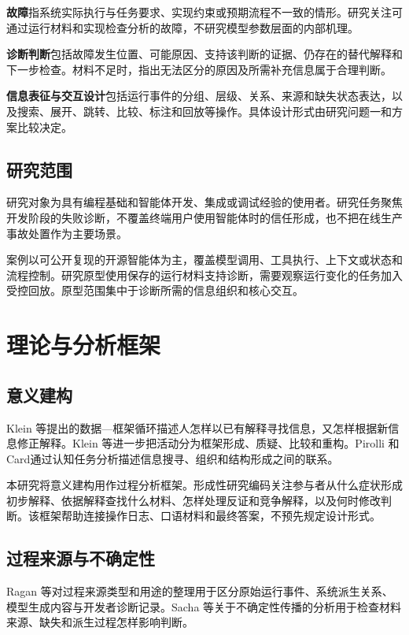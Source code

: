 \textbf{故障}指系统实际执行与任务要求、实现约束或预期流程不一致的情形。研究关注可通过运行材料和实现检查分析的故障，不研究模型参数层面的内部机理。

\textbf{诊断判断}包括故障发生位置、可能原因、支持该判断的证据、仍存在的替代解释和下一步检查。材料不足时，指出无法区分的原因及所需补充信息属于合理判断。

\textbf{信息表征与交互设计}包括运行事件的分组、层级、关系、来源和缺失状态表达，以及搜索、展开、跳转、比较、标注和回放等操作。具体设计形式由研究问题一和方案比较决定。

\subsection{研究范围}

研究对象为具有编程基础和智能体开发、集成或调试经验的使用者。研究任务聚焦开发阶段的失败诊断，不覆盖终端用户使用智能体时的信任形成，也不把在线生产事故处置作为主要场景。

案例以可公开复现的开源智能体为主，覆盖模型调用、工具执行、上下文或状态和流程控制。研究原型使用保存的运行材料支持诊断，需要观察运行变化的任务加入受控回放。原型范围集中于诊断所需的信息组织和核心交互。

\section{理论与分析框架}

\subsection{意义建构}

Klein 等\cite{ref10}\cite{ref11}提出的数据—框架循环描述人怎样以已有解释寻找信息，又怎样根据新信息修正解释。Klein 等\cite{ref12}进一步把活动分为框架形成、质疑、比较和重构。Pirolli 和 Card\cite{ref17}通过认知任务分析描述信息搜寻、组织和结构形成之间的联系。

本研究将意义建构用作过程分析框架。形成性研究编码关注参与者从什么症状形成初步解释、依据解释查找什么材料、怎样处理反证和竞争解释，以及何时修改判断。该框架帮助连接操作日志、口语材料和最终答案，不预先规定设计形式。

\subsection{过程来源与不确定性}

Ragan 等\cite{ref36}对过程来源类型和用途的整理用于区分原始运行事件、系统派生关系、模型生成内容与开发者诊断记录。Sacha 等\cite{ref39}关于不确定性传播的分析用于检查材料来源、缺失和派生过程怎样影响判断。

